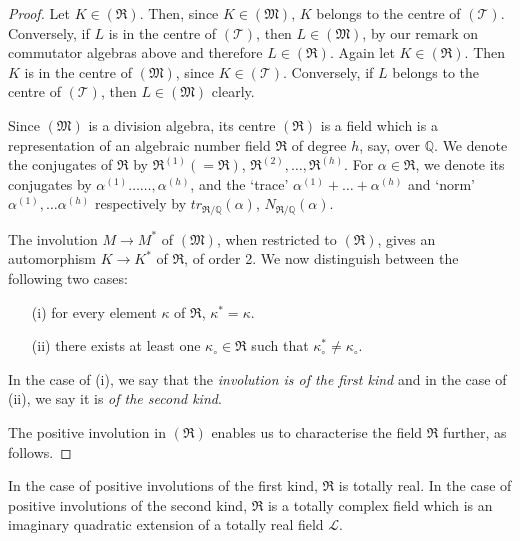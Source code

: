 \begin{proof}
Let \pageoriginale $K \in (\mathfrak{R})$. Then, since $K \in
(\mathfrak{M})$, $K$ belongs to the centre of
$(\mathscr{T})$. Conversely, if $L$ is in the centre of
$(\mathscr{T})$, then $L\in(\mathfrak{M})$, by our remark on
commutator algebras above and therefore $L\in (\mathfrak{R})$. Again
let $K \in (\mathfrak{R})$. Then $K$ is in the centre of
$(\mathfrak{M})$, since $K \in (\mathscr{T})$. Conversely, if $L$
belongs to the centre of $(\mathscr{T})$, then $L \in (\mathfrak{M})$
clearly.

Since $(\mathfrak{M})$ is a division algebra, its centre
$(\mathfrak{R})$ is a field which is a representation of an algebraic
number field $\mathfrak{R}$ of degree $h$, say, over $\mathbb{Q}$. We
denote the conjugates of $\mathfrak{R}$ by $\mathfrak{R}^{(1)}
(=\mathfrak{R})$, $\mathfrak{R}^{(2)},\ldots, \mathfrak{R}^{(h)}$. For
$\alpha \in \mathfrak{R}$, we denote its conjugates by $\alpha^{(1)}
\ldots \ldots, \alpha^{(h)}$, and the `trace' $\alpha^{(1)} + \ldots +
\alpha^{(h)}$ and `norm' $\alpha^{(1)},\ldots \alpha^{(h)}$
respectively by $tr_{\mathfrak{R}/\mathbb{Q}}(\alpha)$,
$N_{\mathfrak{R}/\mathbb{Q}} (\alpha)$.

The involution $M \rightarrow M^{\ast}$ of $(\mathfrak{M})$, when
restricted to $(\mathfrak{R})$, gives an automorphism $K\rightarrow
K^{\ast}$ of $\mathfrak{R}$, of order 2. We now distinguish between
the following two cases:
\begin{itemize}
\item[{\rm (i)}] for every element $\kappa$ of $\mathfrak{R}$,
  $\kappa^{\ast} = \kappa$.

\item[{\rm (ii)}] there exists at least one $\kappa_{\circ} \in
  \mathfrak{R}$ such that $\kappa^{\ast}_{\circ} \neq \kappa_{\circ}$.
\end{itemize}

In \pageoriginale the case of (i), we say that the {\em involution is
  of the first kind} and in the case of (ii), we say it is {\em of the
second kind}.

The positive involution in $(\mathfrak{R})$ enables us to characterise
the field $\mathfrak{R}$ further, as follows.
\end{proof}

\begin{thm}\label{chap1:thm2}
In the case of positive involutions of the first kind, $\mathfrak{R}$
is totally real. In the case of positive involutions of the second
kind, $\mathfrak{R}$ is a totally complex field which is an imaginary
quadratic extension of a totally real field $\mathscr{L}$.
\end{thm}

